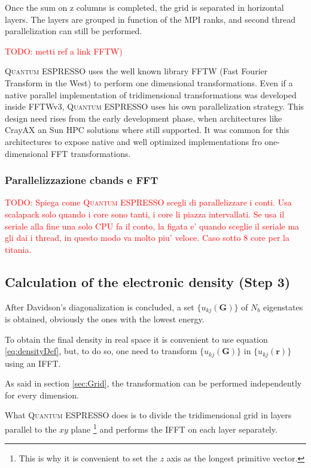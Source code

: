 \documentclass[a4paper,12pt]{article}
\newcommand\mynotes[1]{\begin{flushright}

\textcolor{red}{TODO: #1}\end{flushright}}
\newcommand\erre{\mathbf{r}}
\newcommand\GI{\mathbf{G}}
\newcommand\QE{\textsc{Quantum} ESPRESSO }
\begin{document}
Once the sum on z columns is completed, the grid is separated in horizontal layers. 
The layers are grouped in function of the MPI ranks, and second thread parallelization can still be performed.

\mynotes{metti ref a link FFTW)}
\QE uses the well known library FFTW (Fast Fourier Transform in the West) to perform one dimensional transformations. 
Even if a native parallel implementation of tridimensional transformations was developed inside FFTWv3, \QE uses his own parallelization strategy. 
This design need rises from the early development phase, when architectures like CrayAX an Sun HPC solutions where still supported. It was common for this architectures to expose native and well optimized implementations fro one-dimensional FFT transformations.

\subsubsection{Parallelizzazione cbands e FFT}

\mynotes{Spiega come \QE scegli di parallelizzare i conti. Usa scalapack solo quando i core sono tanti, i core li piazza intervallati. Se usa il seriale alla fine una solo CPU fa il conto, la figata e' quando sceglie il seriale ma gli dai i thread, in questo modo va molto piu' veloce. Caso sotto 8 core per la titania.}



\subsection{Calculation of the electronic density (Step 3)}

After Davidson's diagonalization is concluded, a set $\{ u_{kj}(\GI) \}$ of $N_{b}$ eigenstates is obtained, obviously the ones with the lowest energy.

To obtain the final density in real space it is convenient to use equation \eqref{eq:densityDef}, but, to do so, one need to transform $\{ u_{kj}(\GI) \}$ in $\{ u_{kj}(\erre) \}$ using an IFFT.

As said in section \ref{sec:Grid}, the transformation can be performed independently for every dimension. 

What \QE does is to divide the tridimensional grid in layers parallel to the $xy$ plane \footnote{This is why it is convenient to set the $z$ axis as the longest primitive vector.} and performs the IFFT on each layer separately.
\end{document}
